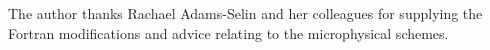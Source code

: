 \documentclass{ametsoc}
\begin{document}
{\begin{acknowledgment} 
The author thanks Rachael Adams-Selin and her colleagues for supplying the Fortran modifications and advice relating to the microphysical schemes.
\end{acknowledgment}







}
\end{document}
